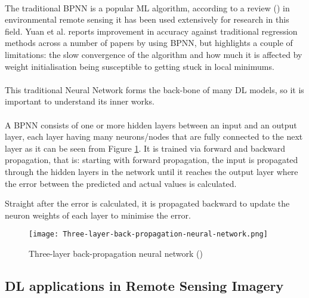 \paragraph{}
The traditional \gls{BPNN} is a popular \gls{ML} algorithm, according to a review (\cite{YUAN2020111716}) in environmental remote sensing it has been used extensively for research in this field. Yuan et al. reports improvement in accuracy against traditional regression methods across a number of papers by using \gls{BPNN}, but highlights a couple of limitations: the slow convergence of the algorithm and how much it is affected by weight initialisation being susceptible to getting stuck in local minimums. 

\paragraph{}
This traditional Neural Network forms the back-bone of many \gls{DL} models, so it is important to understand its inner works.

\paragraph{}

A \gls{BPNN} consists of one or more hidden layers between an input and an output layer, each layer having many neurons/nodes that are fully connected to the next layer as it can be seen from Figure \ref{fig_bpnn}.  It is trained via forward and backward propagation, that is: starting with forward propagation, the input is propagated through the hidden layers in the network until it reaches the output layer where the error between the predicted and actual values is calculated. 

Straight after the error is calculated, it is propagated backward to update the neuron weights of each layer to minimise the error.

    \begin{figure}[hbt!]
        \centering
        \texttt{[image: Three-layer-back-propagation-neural-network.png]}
        \caption{Three-layer back-propagation neural network (\cite{NNpic})}
        \label{fig_bpnn}
    \end{figure}

\subsection{\gls{DL} applications in Remote Sensing Imagery} \label{dl_rs}

